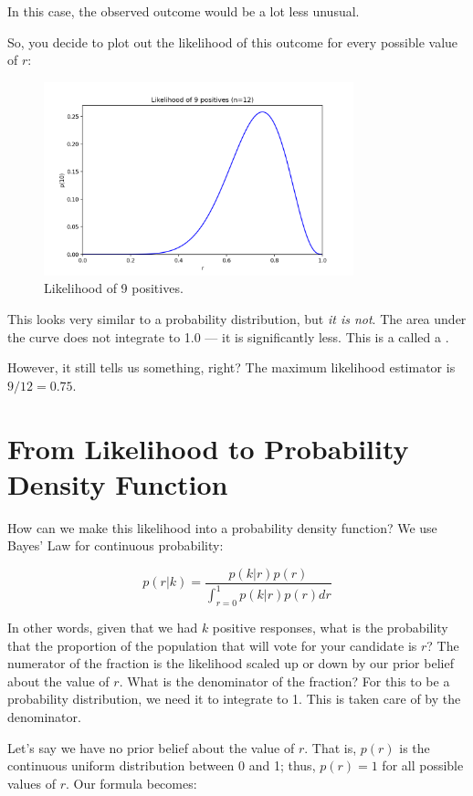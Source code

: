 In this case, the observed outcome would be a lot less unusual.

So, you decide to plot out the likelihood of this outcome for every possible value of $r$:
\begin{figure}[htbp]
    \centering
    \includegraphics[width=0.8\textwidth]{likelihood.png}
    \caption{Likelihood of 9 positives.}
    \label{fig:likelihood_dist}
\end{figure}

This looks very similar to a probability distribution, but \emph{it is not}. The area under the curve does not integrate to 1.0 --- it is significantly less. This is a called a .

However, it still tells us something, right? The maximum likelihood estimator is $9/12 = 0.75$.

\section{From Likelihood to Probability Density Function}

How can we make this likelihood into a probability density function? We use Bayes' Law for continuous probability:

$$p(r|k) = \frac{p(k | r) p(r)}{\int_{r = 0}^{1} p(k | r) p(r) dr}$$

In other words, given that we had $k$ positive responses, what is the probability that the proportion of the population that will vote for your candidate is $r$?  The numerator of the fraction is the likelihood scaled up or down by our prior belief about the value of $r$.  What is the denominator of the fraction? For this to be a probability distribution, we need it to integrate to 1. This is taken care of by the denominator.

Let's say we have no prior belief about the value of $r$.  That is, $p(r)$ is the continuous uniform distribution between 0 and 1; thus, $p(r) = 1$ for all possible values of $r$. Our formula becomes:

